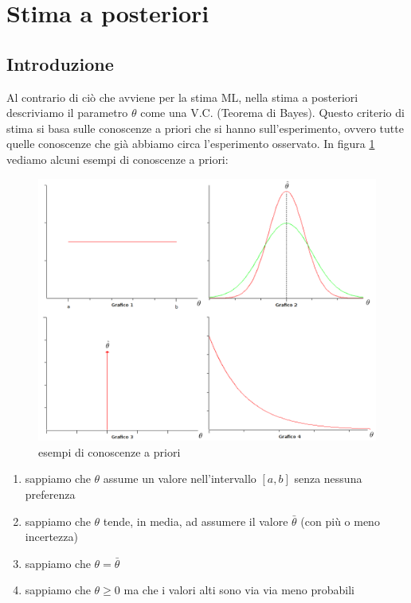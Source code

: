 \section{Stima a posteriori} 
\subsection{Introduzione}
Al contrario di ciò che avviene per la stima ML, nella stima a posteriori descriviamo il parametro $\theta$ come una V.C. (Teorema di Bayes). Questo criterio di stima si basa sulle conoscenze a priori che si hanno sull'esperimento, ovvero tutte quelle conoscenze che già abbiamo circa l'esperimento osservato. In figura \ref{fig:apriori} vediamo alcuni esempi di conoscenze a priori:

  \begin{figure}[htbp]
    \centering
    \includegraphics[scale=0.3]{img/spost.png}
    \caption{esempi di conoscenze a priori\label{fig:apriori}}
  \end{figure}

\begin{enumerate}
  \item sappiamo che $\theta$ assume un valore nell'intervallo $[a,b]$ senza nessuna preferenza
  \item sappiamo che $\theta$ tende, in media, ad assumere il valore $\bar{\theta}$ (con più o meno incertezza)
  \item sappiamo che $\theta=\bar{\theta}$
  \item sappiamo che $\theta \geq 0$ ma che i valori alti sono via via meno probabili
\end{enumerate}

